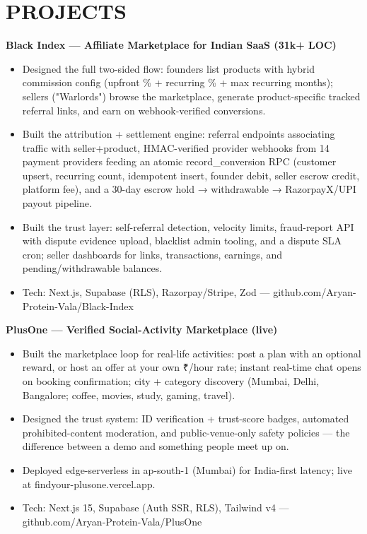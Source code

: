 \documentclass[9pt]{article}
\begin{document}
\section*{PROJECTS}
\textbf{Black Index  ---  Affiliate Marketplace for Indian SaaS (31k+ LOC)}
\vspace{1pt}
\begin{itemize}[leftmargin=11pt,itemsep=0pt,topsep=1pt,parsep=0pt]
\item Designed the full two-sided flow: founders list products with hybrid commission config (upfront \% + recurring \% + max recurring months); sellers ("Warlords") browse the marketplace, generate product-specific tracked referral links, and earn on webhook-verified conversions.
\item Built the attribution + settlement engine: referral endpoints associating traffic with seller+product, HMAC-verified provider webhooks from 14 payment providers feeding an atomic record\_conversion RPC (customer upsert, recurring count, idempotent insert, founder debit, seller escrow credit, platform fee), and a 30-day escrow hold → withdrawable → RazorpayX/UPI payout pipeline.
\item Built the trust layer: self-referral detection, velocity limits, fraud-report API with dispute evidence upload, blacklist admin tooling, and a dispute SLA cron; seller dashboards for links, transactions, earnings, and pending/withdrawable balances.
\item Tech: Next.js, Supabase (RLS), Razorpay/Stripe, Zod  ---  github.com/Aryan-Protein-Vala/Black-Index
\end{itemize}
\textbf{PlusOne  ---  Verified Social-Activity Marketplace (live)}
\vspace{1pt}
\begin{itemize}[leftmargin=11pt,itemsep=0pt,topsep=1pt,parsep=0pt]
\item Built the marketplace loop for real-life activities: post a plan with an optional reward, or host an offer at your own ₹/hour rate; instant real-time chat opens on booking confirmation; city + category discovery (Mumbai, Delhi, Bangalore; coffee, movies, study, gaming, travel).
\item Designed the trust system: ID verification + trust-score badges, automated prohibited-content moderation, and public-venue-only safety policies  ---  the difference between a demo and something people meet up on.
\item Deployed edge-serverless in ap-south-1 (Mumbai) for India-first latency; live at findyour-plusone.vercel.app.
\item Tech: Next.js 15, Supabase (Auth SSR, RLS), Tailwind v4  ---  github.com/Aryan-Protein-Vala/PlusOne
\end{itemize}
\end{document}
